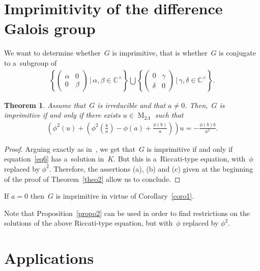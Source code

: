 \documentclass[10pt,a4paper]{amsart}
\numberwithin{equation}{section}
\newtheorem{Theorem}{Theorem}[section]
\begin{document}
\section{Imprimitivity of the dif\/ference Galois group}
\label{sec5}

We want to determine whether~$G$ is imprimitive, that is whether~$G$ is conjugate to a~subgroup of
\begin{gather*}
\left\{
\begin{pmatrix}
\alpha&0
\\
0&\beta
\end{pmatrix}
\, \vert \, \alpha, \beta \in \mathbb C^{\times} \right\} \bigcup \left\{
\begin{pmatrix}
0&\gamma
\\
\delta &0
\end{pmatrix}
\, \vert \, \gamma, \delta \in \mathbb C^{\times} \right\}.
\end{gather*}

\begin{Theorem}
\label{riccati et imprimitivite}
Assume that~$G$ is irreducible and that $a\neq 0$.
Then,~$G$ is imprimitive if and only if there exists $u\in \operatorname{M}_{2\Lambda}$ such that
\begin{gather}
\label{eq6}
\left(\phi^{2}(u)+\left(\phi^{2}\left(\frac{b}{a}\right)-\phi(a)+\frac{\phi(b)}{a} \right)\right)
u=-\frac{\phi(b)b}{a^{2}}.
\end{gather}
\end{Theorem}

\begin{proof}
Arguing exactly as in~\cite[Theorem 4.6]{Hen98}, we get that~$G$ is imprimitive if and only if equation~\eqref{eq6} has
a~solution in~$K$.
But this is a~Riccati-type equation, with~$\phi$ replaced by $\phi^{2}$.
Therefore, the assertions (a), (b) and (c) given at the beginning of the proof of Theorem~\ref{theo2} allow us to
conclude.
\end{proof}

\begin{Remark}
If $a=0$ then~$G$ is imprimitive in virtue of Corollary~\ref{coro1}.
\end{Remark}

Note that Proposition~\ref{propo2} can be used in order to f\/ind restrictions on the solutions of the above Riccati-type
equation, but with~$\phi$ replaced by $\phi^{2}$.

\section{Applications}
\label{sec6}
\end{document}
